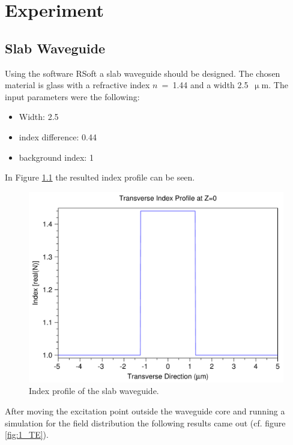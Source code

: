 \chapter{Experiment}
\section{Slab Waveguide}
Using the software RSoft a slab waveguide should be designed. The chosen material is glass with a refractive index $n$~=~1.44 and a width 2.5~$\upmu$m.  The input parameters were the following:
\begin{itemize}
	\item Width: 2.5
	\item index difference: 0.44
	\item background index: 1
 \end{itemize}

In Figure \ref{fig:1_index} the resulted index profile can be seen.
\begin{figure}[h]%
\centering
\includegraphics[totalheight=5.5 cm]{Grafiken/1_index.pdf}%
\caption{Index profile of the slab waveguide.}
\label{fig:1_index}%
\end{figure}

After moving the excitation point outside the waveguide core and running a simulation for the field distribution the following results came out (cf. figure \ref{fig:1_TE}).

